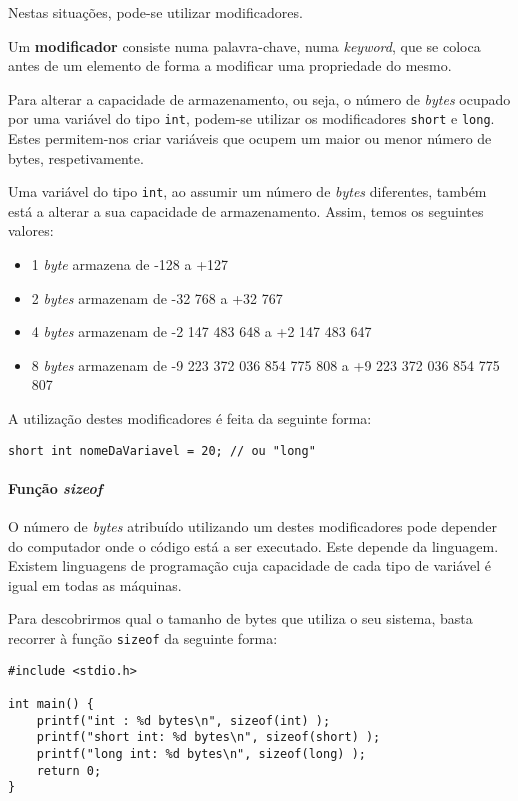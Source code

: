 Nestas situações, pode-se utilizar modificadores.

\begin{defi}
Um \textbf{modificador} consiste numa palavra-chave, numa \textit{keyword}, que se coloca antes de um elemento de forma a modificar uma propriedade do mesmo.
\end{defi}

Para alterar a capacidade de armazenamento, ou seja, o número de \textit{bytes} ocupado por uma variável do tipo \texttt{int}, podem-se utilizar os modificadores \texttt{short} e \texttt{long}. Estes permitem-nos criar variáveis que ocupem um maior ou menor número de bytes, respetivamente.

Uma variável do tipo \texttt{int}, ao assumir um número de \textit{bytes} diferentes, também está a alterar a sua capacidade de armazenamento. Assim, temos os seguintes valores:

\begin{itemize}
\item 1 \textit{byte} armazena de -128 a +127
\item 2 \textit{bytes} armazenam de -32 768 a +32 767
\item 4 \textit{bytes} armazenam de -2 147 483 648 a +2 147 483 647
\item 8 \textit{bytes} armazenam de -9 223 372 036 854 775 808 a +9 223 372 036 854 775 807
\end{itemize}

A utilização destes modificadores é feita da seguinte forma:

\begin{lstlisting}
short int nomeDaVariavel = 20; // ou "long"
\end{lstlisting}

\paragraph{Função \textit{sizeof}}

O número de \textit{bytes} atribuído utilizando um destes modificadores pode depender do computador onde o código está a ser executado. Este  depende da linguagem. Existem linguagens de programação cuja capacidade de cada tipo de variável é igual em todas as máquinas.

Para descobrirmos qual o tamanho de bytes que utiliza o seu sistema, basta recorrer à função \texttt{sizeof} da seguinte forma:

\begin{lstlisting}
#include <stdio.h>
 
int main() {    
    printf("int : %d bytes\n", sizeof(int) );
    printf("short int: %d bytes\n", sizeof(short) );
    printf("long int: %d bytes\n", sizeof(long) );
    return 0;
}
\end{lstlisting}

